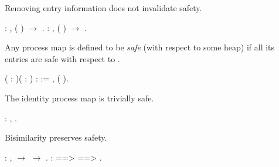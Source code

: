\documentclass[12pt]{report}
\begin{document}
Removing entry information does not invalidate safety. \begin{coqdoccode}
\coqdocemptyline
\coqdocnoindent
{}  :\coqdoceol
\coqdocindent{1.00em}
\coqdockw{\ensuremath{\forall}}   ,\coqdoceol
\coqdocindent{1.00em}
  (  ) \ensuremath{\rightarrow}\coqdoceol
\coqdocindent{1.00em}
  .\coqdoceol
\coqdocemptyline
\coqdocnoindent
{}  :\coqdoceol
\coqdocindent{1.00em}
\coqdockw{\ensuremath{\forall}}   ,\coqdoceol
\coqdocindent{1.00em}
  (  ) \ensuremath{\rightarrow}\coqdoceol
\coqdocindent{1.00em}
  .\coqdoceol
\coqdocemptyline
\end{coqdoccode}
Any process map is defined to be \textit{safe} (with respect to some heap)
    if all its entries are safe with respect to . \begin{coqdoccode}
\coqdocemptyline
\coqdocnoindent
{}  ( : )( : ) :  :=\coqdoceol
\coqdocindent{1.00em}
\coqdockw{\ensuremath{\forall}} ,   ( ).\coqdoceol
\coqdocemptyline
\end{coqdoccode}
The identity process map is trivially safe. \begin{coqdoccode}
\coqdocemptyline
\coqdocnoindent
{}  :\coqdoceol
\coqdocindent{1.00em}
\coqdockw{\ensuremath{\forall}} ,   .\coqdoceol
\coqdocemptyline
\end{coqdoccode}
Bisimilarity preserves safety. \begin{coqdoccode}
\coqdocemptyline
\coqdocnoindent
{}  :\coqdoceol
\coqdocindent{1.00em}
\coqdockw{\ensuremath{\forall}}   ,\coqdoceol
\coqdocindent{1.00em}
   \ensuremath{\rightarrow}    \ensuremath{\rightarrow}   .\coqdoceol
\coqdocnoindent
{}   : \coqdoceol
\coqdocindent{1.00em}
   ==>  ==> \coqdoceol
\coqdocindent{2.00em}
 .\coqdoceol
\coqdocemptyline
\end{coqdoccode}
\end{document}
